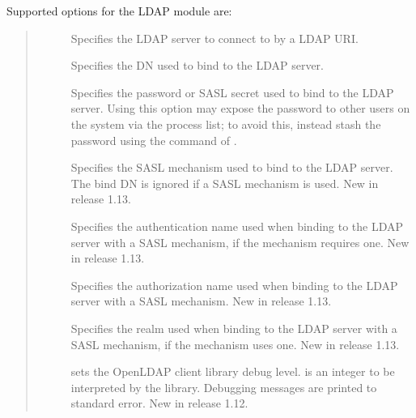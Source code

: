 \documentclass[letterpaper,10pt,english]{sphinxmanual}
\begin{document}
\sphinxAtStartPar
Supported options for the LDAP module are:
\begin{quote}
\begin{description}
\item[{}] \leavevmode
\sphinxAtStartPar
Specifies the LDAP server to connect to by a LDAP URI.

\item[{}] \leavevmode
\sphinxAtStartPar
Specifies the DN used to bind to the LDAP server.

\item[{}] \leavevmode
\sphinxAtStartPar
Specifies the password or SASL secret used to bind to the LDAP
server.  Using this option may expose the password to other
users on the system via the process list; to avoid this,
instead stash the password using the  command of
{\hyperref[\detokenize{admin/admin_commands/kdb5_ldap_util:kdb5-ldap-util-8}]{}}.

\item[{}] \leavevmode
\sphinxAtStartPar
Specifies the SASL mechanism used to bind to the LDAP server.
The bind DN is ignored if a SASL mechanism is used.  New in
release 1.13.

\item[{}] \leavevmode
\sphinxAtStartPar
Specifies the authentication name used when binding to the
LDAP server with a SASL mechanism, if the mechanism requires
one.  New in release 1.13.

\item[{}] \leavevmode
\sphinxAtStartPar
Specifies the authorization name used when binding to the LDAP
server with a SASL mechanism.  New in release 1.13.

\item[{}] \leavevmode
\sphinxAtStartPar
Specifies the realm used when binding to the LDAP server with
a SASL mechanism, if the mechanism uses one.  New in release
1.13.

\item[{}] \leavevmode
\sphinxAtStartPar
sets the OpenLDAP client library debug level.   is an
integer to be interpreted by the library.  Debugging messages
are printed to standard error.  New in release 1.12.

\end{description}
\end{quote}
\end{document}
